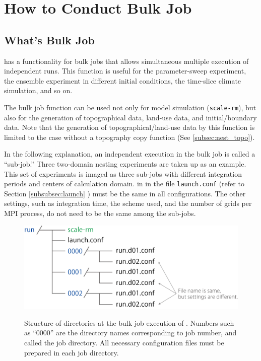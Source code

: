 \section{How to Conduct Bulk Job} \label{sec:bulkjob}

\subsection{What's Bulk Job}
 \scalerm has a functionality for bulk jobs that allows simultaneous multiple execution of independent runs.
This function is useful for the parameter-sweep experiment, the ensemble experiment in different initial conditions, the time-slice climate simulation, and so on.

The bulk job function can be used not only for model simulation (\verb|scale-rm|), but also for the generation of topographical data, land-use data, and initial/boundary data. Note that the generation of topographical/land-use data by this function is limited to the case without a topography copy function (See \ref{subsec:nest_topo}).

In the following explanation, an independent execution in the bulk job is called a ``sub-job.'' Three two-domain nesting experiments are taken up as an example. This set of experiments is imaged as three sub-jobs with different integration periods and centers of calculation domain.  in  in the file \verb|launch.conf| (refer to Section \ref{subsubsec:launch} ) must be the same in all configurations. The other settings, such as integration time, the scheme used, and the number of grids per MPI process, do not need to be the same among the sub-jobs.

\begin{figure}[t]
\begin{center}
  \includegraphics[width=0.6\hsize]{./figure/bulkjob_directory_structure.png}\\
  \caption{Structure of directories at the bulk job execution of \scalerm.
Numbers such as ``0000'' are the directory names corresponding to job number, and called the job directory.   All necessary configuration files must be prepared in each job directory.
}
  \label{fig_bulkjob}
\end{center}
\end{figure}



